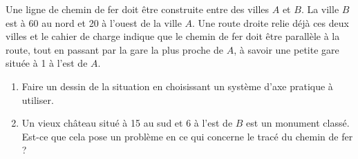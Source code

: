 
\begin{exercice}\label{exosmath-0649}

Une ligne de chemin de fer doit être construite entre des villes \( A\) et \( B\). La ville \( B\) est à \unit{60}{\kilo\meter} au nord et \unit{20}{\kilo\meter} à l'ouest de la ville \( A\). Une route droite relie déjà ces deux villes et le cahier de charge indique que le chemin de fer doit être parallèle à la route, tout en passant par la gare la plus proche de \( A\), à savoir une petite gare située à \unit{1}{\kilo\meter} à l'est de \( A\).

\begin{enumerate}
    \item
        Faire un dessin de la situation en choisissant un système d'axe pratique à utiliser.
    \item
        Un vieux château situé à \unit{15}{\kilo\meter} au sud et \unit{6}{\kilo\meter} à l'est de \( B\) est un monument classé. Est-ce que cela pose un problème en ce qui concerne le tracé du chemin de fer ?
\end{enumerate}

\end{exercice}
